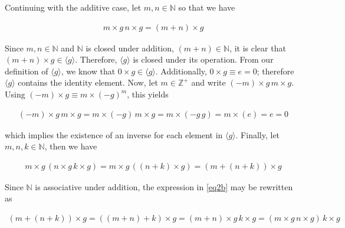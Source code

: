 \documentclass{article}[12]
\numberwithin{equation}{section}
\newcommand{\N}{\mathbb{N}}
\newcommand{\Z}{\mathbb{Z}}
\begin{document}
\begin{flushleft}
Continuing with the additive case, let $m, n \in \N$ so that we have

\begin{align*}
  m \times g \, n \times g = \left( m + n \right) \times g
\end{align*}

Since $m, n \in \N$ and $\N$ is closed under addition, $\left( m + n \right) \in \N$, it is clear that $\left(m + n\right) \times g \in \langle g \rangle$.  Therefore, $\langle g \rangle$ is closed under its operation.  From our definition of $\langle g \rangle$, we know that $0 \times g \in \langle g \rangle$.  Additionally, $0 \times g \equiv e = 0$; therefore $\langle g \rangle$ contains the identity element.  Now, let $m \in \Z^+$ and write $\left(-m\right) \times g \, m \times g$.  Using $\left(-m\right) \times g \equiv m \times \left( - g \right)^m$, this yields

\begin{align*}
  \left(-m\right) \times g \, m \times g = m \times \left( -g \right) \, m \times g = m \times \left( -g \, g \right) = m \times \left( e \right) = e = 0
\end{align*}

which implies the existence of an inverse for each element in $\langle g \rangle$.  Finally, let $m, n, k \in \N$, then we have

\begin{align}
  m \times g \, \left( n \times g \, k \times g \right) = m \times g \, \left( \left(n+k\right) \times g \right) = \left(m + \left( n + k \right)\right) \times g \label{eq2b}
\end{align}

Since $\N$ is associative under addition, the expression in \ref{eq2b} may be rewritten as

\begin{align*}
  \left(m + \left( n + k \right)\right) \times g = \left( \left(m+n\right) + k \right) \times g = \left(m+n\right) \times g \, k \times g = \left( m \times g \, n \times g \right) \, k \times g
\end{align*}


\end{flushleft}
\end{document}
